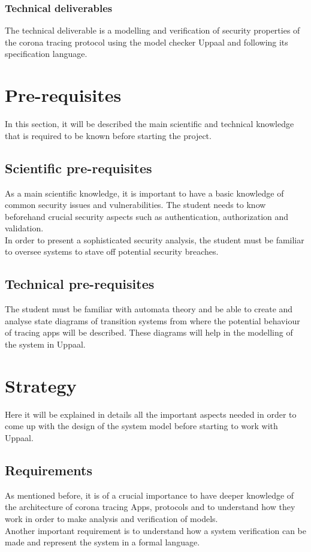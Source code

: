 \documentclass[a4paper, twocolumn]{article}
\begin{document}
\subsubsection{Technical deliverables}
The technical deliverable is a modelling and verification of security properties of the corona tracing protocol using the model checker Uppaal and following its specification language.


\section{Pre-requisites} 
In this section, it will be described the main scientific and technical knowledge that is required to be known before starting the project.

\subsection{Scientific pre-requisites}
As a main scientific knowledge, it is important to have a basic knowledge of common security issues and vulnerabilities. The student needs to know beforehand crucial security aspects such as authentication, authorization and validation.\\
In order to present a sophisticated security analysis, the student must be familiar to oversee systems to stave off potential security breaches. 

\subsection{Technical pre-requisites}
The student must be familiar with automata theory and be able to create and analyse state diagrams of transition systems from where the potential behaviour of tracing apps will be described. These diagrams will help in the modelling of the system in Uppaal.

\section{Strategy}%
Here it will be explained in details all the important aspects needed in order to come up with the design of the system model before starting to work with Uppaal.
\label{sec-production}

\subsection{Requirements}
As mentioned before, it is of a crucial importance to have deeper knowledge of the architecture of corona tracing Apps, protocols and to understand how they work in order to make analysis and verification of models.\\
Another important requirement is to understand how a system verification can be made and represent the system in a formal language.
\end{document}
